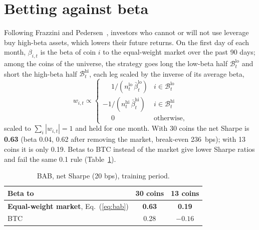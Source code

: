 \documentclass[aps,prl,onecolumn,superscriptaddress,nofootinbib]{revtex4-2}
\begin{document}
	\section{Betting against beta}
	\label{sec:bab}

	Following Frazzini and Pedersen~\cite{frazzini2014}, investors who cannot or will not use leverage buy high-beta assets, which lowers their future returns. On the first day of each month, $\beta_{i,t}$ is the beta of coin $i$ to the equal-weight market over the past 90 days; among the coins of the universe, the strategy goes long the low-beta half $\mathcal B^{\mathrm{lo}}_t$ and short the high-beta half $\mathcal B^{\mathrm{hi}}_t$, each leg scaled by the inverse of its average beta,
	\begin{equation}
		w_{i,t} \propto
		\begin{cases}
			\phantom{-}1 / (n^{\mathrm{lo}}_t\, \bar\beta^{\mathrm{lo}}_t) & i \in \mathcal B^{\mathrm{lo}}_t \\
			-1 / (n^{\mathrm{hi}}_t\, \bar\beta^{\mathrm{hi}}_t) & i \in \mathcal B^{\mathrm{hi}}_t \\
			\phantom{-}0 & \text{otherwise,}
		\end{cases}
		\label{eq:bab}
	\end{equation}
	scaled to $\sum_i |w_{i,t}| = 1$ and held for one month. With 30 coins the net Sharpe is \textbf{0.63} (beta 0.04, 0.62 after removing the market, break-even 236~bps); with 13 coins it is only 0.19. Betas to BTC instead of the market give lower Sharpe ratios and fail the same 0.1 rule (Table~\ref{tab:bab}).

	\begin{table}[!htbp]
		\caption{BAB, net Sharpe (20 bps), training period.}
		\label{tab:bab}
		\begin{ruledtabular}
			\begin{tabular}{lcc}
				Beta to & 30 coins & 13 coins \\
				\hline
				\textbf{Equal-weight market}, Eq.~(\ref{eq:bab}) & \textbf{0.63} & \textbf{0.19} \\
				BTC                                           & 0.28 & $-0.16$ \\
			\end{tabular}
		\end{ruledtabular}
	\end{table}

\end{document}
